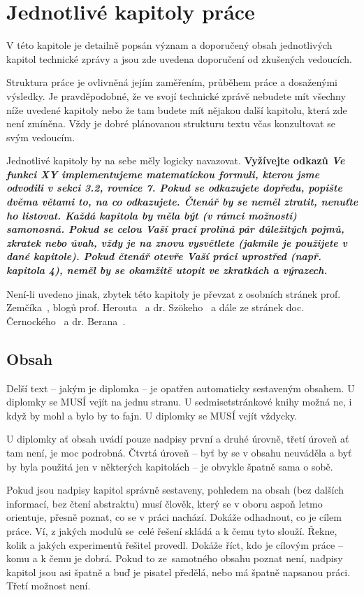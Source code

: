 \chapter{Jednotlivé kapitoly práce}
\label{kapitoly}

V této kapitole je detailně popsán význam a doporučený obsah jednotlivých kapitol technické zprávy a jsou zde uvedena doporučení od zkušených vedoucích.

Struktura práce je ovlivněná jejím zaměřením, průběhem práce a dosaženými výsledky. Je pravděpodobné, že ve svojí technické zprávě nebudete mít všechny níže uvedené kapitoly nebo že tam budete mít nějakou další kapitolu, která zde není zmíněna. Vždy je dobré plánovanou strukturu textu včas konzultovat se svým vedoucím.

Jednotlivé kapitoly by na sebe měly logicky navazovat. \bf Vyžívejte odkazů \rm \it Ve funkci XY implementujeme matematickou formuli, kterou jsme odvodili v sekci 3.2, rovnice 7. \rm Pokud se odkazujete dopředu, popište dvěma větami to, na co odkazujete. Čtenář by se neměl ztratit, nenuťte ho listovat. \bf Každá kapitola by měla být (v rámci možností) samonosná. \rm Pokud se celou Vaší prací prolíná pár důležitých pojmů, zkratek nebo úvah, vždy je na znovu vysvětlete (jakmile je použijete v dané kapitole). Pokud čtenář otevře Vaší práci uprostřed (např. kapitola 4), neměl by se okamžitě utopit ve zkratkách a výrazech.~\cite{rady}

Není-li uvedeno jinak, zbytek této kapitoly je převzat z osobních stránek prof. Zemčíka~\cite{Zemcik}, blogů prof. Herouta~\cite{Herout} a dr. Szökeho~\cite{rady} a dále ze stránek doc. Černockého~\cite{Cernocky} a dr. Berana~\cite{Beran}.

\section{Obsah}
\label{obsah}

Delší text -- jakým je diplomka -- je opatřen automaticky sestaveným obsahem. U diplomky se MUSÍ vejít na jednu stranu. U sedmisetstránkové knihy možná ne, i když by mohl a bylo by to fajn. U diplomky se MUSÍ vejít vždycky.

U diplomky ať obsah uvádí pouze nadpisy první a druhé úrovně, třetí úroveň ať tam není, je moc podrobná. Čtvrtá úroveň -- byť by se v obsahu neuváděla a byť by byla použitá jen v některých kapitolách -- je obvykle špatně sama o sobě.

Pokud jsou nadpisy kapitol správně sestaveny, pohledem na obsah (bez dalších informací, bez čtení abstraktu) musí člověk, který se v oboru aspoň letmo orientuje, přesně poznat, co se v práci nachází. Dokáže odhadnout, co je cílem práce. Ví, z jakých modulů se~celé řešení skládá a k čemu tyto slouží. Řekne, kolik a jakých experimentů řešitel provedl. Dokáže říct, kdo je cílovým  práce -- komu a k čemu je dobrá. Pokud to ze~samotného obsahu poznat není, nadpisy kapitol jsou asi špatně a buď je pisatel předělá, nebo má špatně napsanou práci. Třetí možnost není.

